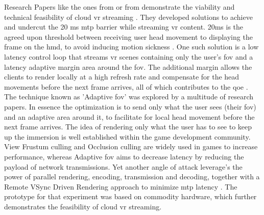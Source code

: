 Research Papers like the ones from \cite{cutcord} or from \cite{mvr} demonstrate the viability and technical feasibility of cloud \acrshort{vr} streaming . They developed solutions to achieve and undercut the 20 \acrfull{ms} \acrfull{mtp} barrier while streaming \acrshort{vr} content. 20\acrshort{ms} is the agreed upon threshold between receiving user head movement to displaying the frame on the \acrfull{hmd}, to avoid inducing motion sickness \parencite{valvevrlatency}. One such solution is a low latency control loop that streams \acrshort{vr} scenes containing only the user’s \acrfull{fov} and a latency adaptive margin area around the \acrshort{fov}. The additional margin allows the clients to render locally at a high refresh rate and compensate for the head movements before the next frame arrives, all of which contributes to the \acrshort{qoe} \parencite{mvr}. The technique known as 'Adaptive \acrshort{fov}' was explored by a multitude of research papers. In essence the optimization is to send only what the user sees (their \acrshort{fov}) and an adaptive area around it, to facilitate for local head movement before the next frame arrives. The idea of rendering only what the user has to see to keep up the immersion is well established within the game development community. View Frustum culling and Occlusion culling \parencite{cullingdefinition} are widely used in games to increase performance, whereas Adaptive \acrshort{fov} aims to decrease latency by reducing the payload of network transmissions. Yet another angle of attack leverage's the power of parallel rendering, encoding, transmission and decoding, together with a Remote VSync Driven Rendering approach to minimize \acrshort{mtp} latency \parencite{cutcord}. The prototype for that experiment was based on commodity hardware, which further demonstrates the feasibility of cloud \acrshort{vr} streaming. 

